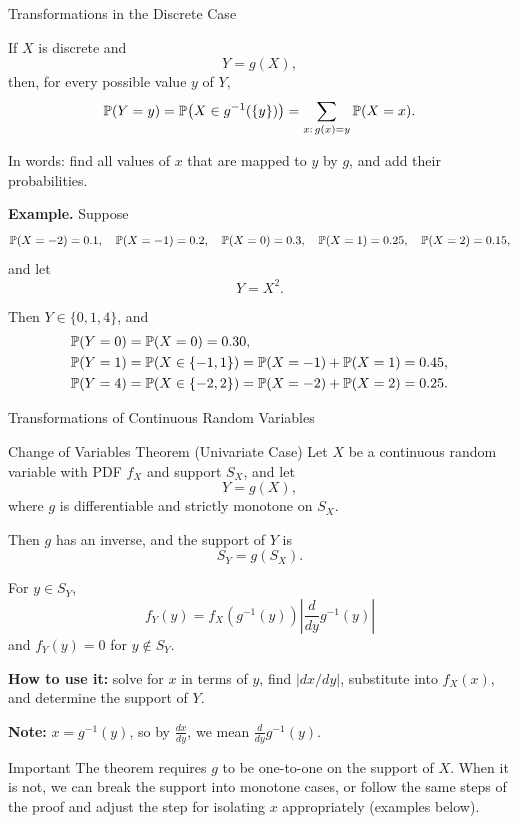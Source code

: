 \begin{frame}{Transformations in the Discrete Case}

If $X$ is discrete and
\[
Y=g(X),
\]
then, for every possible value $y$ of $Y$,
\[
{
\mathbb{P}(Y=y)
=
\mathbb{P}\!\left(X\in g^{-1}(\{y\})\right)
=
\sum_{x:\,g(x)=y}
\mathbb{P}(X=x).
}
\]

In words: find all values of $x$ that are mapped to $y$ by $g$, and add their probabilities.

\vspace{0.25cm}

\textbf{Example.}
Suppose
\[
\mathbb{P}(X=-2)=0.1,\quad
\mathbb{P}(X=-1)=0.2,\quad
\mathbb{P}(X=0)=0.3,\quad
\mathbb{P}(X=1)=0.25,\quad
\mathbb{P}(X=2)=0.15,
\]
and let
\[
Y=X^2.
\]

Then $Y\in\{0,1,4\}$, and
\[
\begin{aligned}
\mathbb{P}(Y=0)
&=\mathbb{P}(X=0)=0.30,\\
\mathbb{P}(Y=1)
&=\mathbb{P}(X\in\{-1,1\})
=\mathbb{P}(X=-1)+\mathbb{P}(X=1)=0.45,\\
\mathbb{P}(Y=4)
&=\mathbb{P}(X\in\{-2,2\})
=\mathbb{P}(X=-2)+\mathbb{P}(X=2)=0.25.
\end{aligned}
\]

\end{frame}
















\begin{frame}{Transformations of Continuous Random Variables}

\small

\begin{keybox}{Change of Variables Theorem (Univariate Case)}
Let $X$ be a continuous random variable with PDF $f_X$ and support $S_X$,
and let
\[
Y=g(X),
\]
where $g$ is differentiable and strictly monotone on $S_X$.

Then $g$ has an inverse, and the support of $Y$ is
\[
S_Y=g(S_X).
\]

For $y\in S_Y$,
\[
{
f_Y(y)
=
f_X\!\left(g^{-1}(y)\right)
\left|
\frac{d}{dy}g^{-1}(y)
\right|
}
\]
and $f_Y(y)=0$ for $y\notin S_Y$.
\end{keybox}
 

\textbf{How to use it:}
solve for $x$ in terms of $y$, find $\left|dx/dy\right|$, substitute into
$f_X(x)$, and determine the support of $Y$.

\textbf{Note:} $x=g^{-1}(y)$, so by $\frac{dx}{dy}$, we mean $\frac{d}{dy}g^{-1}(y)$. 


\begin{keybox}{Important}
The theorem requires $g$ to be one-to-one on the support of $X$. When it is not, we can break the support into monotone cases, or follow the same steps of the proof and adjust the step for isolating $x$ appropriately (examples below).
 
\end{keybox}

\end{frame}


